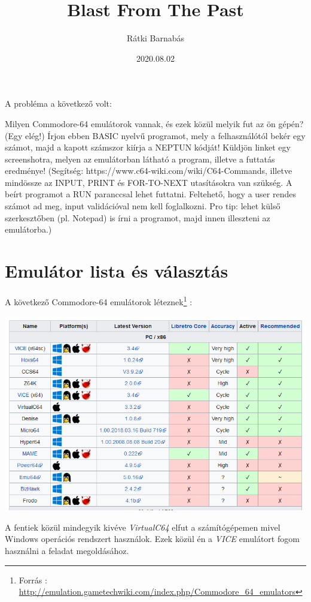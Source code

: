 \documentclass{article}[12pt,a4paper]
\title{Blast From The Past}
\author{Rátki Barnabás}
\date{2020.08.02}
\begin{document}
\maketitle

A probléma a következő volt:
\begin{displayquote}
Milyen Commodore-64 emulátorok vannak, és ezek közül melyik fut az ön gépén? (Egy elég!) Írjon ebben BASIC nyelvű programot, mely a felhasználótól bekér egy számot, majd a kapott számszor kiírja a NEPTUN kódját! Küldjön linket egy screenshotra, melyen az emulátorban látható a program, illetve a futtatás eredménye! (Segítség: https://www.c64-wiki.com/wiki/C64-Commands, illetve mindössze az INPUT, PRINT és FOR-TO-NEXT utasításokra van szükség. A beírt programot a RUN paranccsal lehet futtatni. Feltehető, hogy a user rendes számot ad meg, input validációval nem kell foglalkozni. Pro tip: lehet külső szerkesztőben (pl. Notepad) is írni a programot, majd innen illeszteni az emulátorba.)
\end{displayquote}

\section{Emulátor lista és választás}
A következő Commodore-64 emulátorok léteznek\footnote[1]{Forrás : \url{http://emulation.gametechwiki.com/index.php/Commodore_64_emulators}} : 
\begin{center}
\includegraphics[scale=0.35]{graf1} 
\end{center}

A fentiek közül mindegyik kivéve \textit{VirtualC64} elfut a számítógépemen mivel Windows operációs rendszert használok. Ezek közül én a \textit{VICE} emulátort fogom használni a feladat megoldásához.
\end{document}
